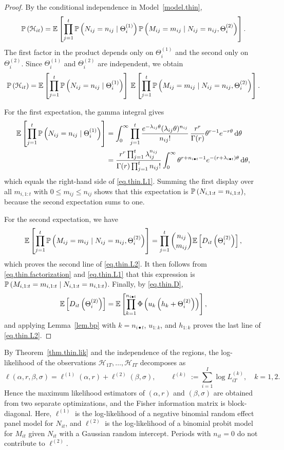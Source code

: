 \begin{proof}
By the conditional independence in Model~\ref{model.thin},
\[
\P{\mathcal H_{it}}
=
\E{
\prod_{j=1}^t
\P{N_{ij}=n_{ij}\mid\Theta_i^{(1)}}
\P{M_{ij}=m_{ij}\mid N_{ij}=n_{ij},\Theta_i^{(2)}}
}.
\]
The first factor in the product depends only on \(\Theta_i^{(1)}\) and
the second only on \(\Theta_i^{(2)}\). Since \(\Theta_i^{(1)}\) and
\(\Theta_i^{(2)}\) are independent, we obtain
\[
\P{\mathcal H_{it}}
=
\E{
\prod_{j=1}^t
\P{N_{ij}=n_{ij}\mid\Theta_i^{(1)}}
}
\,
\E{
\prod_{j=1}^t
\P{M_{ij}=m_{ij}\mid N_{ij}=n_{ij},\Theta_i^{(2)}}
}.
\]

For the first expectation, the gamma integral gives
\[
\begin{aligned}
\E{
\prod_{j=1}^t
\P{N_{ij}=n_{ij}\mid\Theta_i^{(1)}}
}
&=
\int_0^\infty
\prod_{j=1}^t
\frac{e^{-\lambda_{ij}\theta}(\lambda_{ij}\theta)^{n_{ij}}}{n_{ij}!}
\,
\frac{r^r}{\Gamma(r)}\theta^{r-1}e^{-r\theta}
\,{\rm d}\theta\\
&=
\frac{r^r\prod_{j=1}^t\lambda_{ij}^{n_{ij}}}
{\Gamma(r)\prod_{j=1}^t n_{ij}!}
\int_0^\infty
\theta^{r+n_{i\bullet t}-1}
e^{-(r+\lambda_{i\bullet t})\theta}
\,{\rm d}\theta,
\end{aligned}
\]
which equals the right-hand side of \eqref{eq.thin.L1}. Summing the
first display over all \(m_{i,1:t}\) with \(0\le m_{ij}\le n_{ij}\)
shows that this expectation is \(\P{N_{i,1:t}=n_{i,1:t}}\), because
the second expectation sums to one.

For the second expectation, we have
\[
\E{
\prod_{j=1}^t
\P{M_{ij}=m_{ij}\mid N_{ij}=n_{ij},\Theta_i^{(2)}}
}
=
\prod_{j=1}^t\binom{n_{ij}}{m_{ij}}
\E{D_{it}\left(\Theta_i^{(2)}\right)},
\]
which proves the second line of \eqref{eq.thin.L2}. It then follows
from \eqref{eq.thin.factorization} and \eqref{eq.thin.L1} that this
expression is \(\P{M_{i,1:t}=m_{i,1:t}\mid N_{i,1:t}=n_{i,1:t}}\).
Finally, by \eqref{eq.thin.D},
\[
\E{D_{it}\left(\Theta_i^{(2)}\right)}
=
\E{
\prod_{k=1}^{n_{i\bullet t}}
\Phi\left(u_k\left(h_k+\Theta_i^{(2)}\right)\right)
},
\]
and applying Lemma~\ref{lem.bp} with \(k=n_{i\bullet t}\),
\(u_{1:k}\), and \(h_{1:k}\) proves the last line of
\eqref{eq.thin.L2}.
\end{proof}

\begin{remark}
\label{rem.thin.estimation}
By Theorem~\ref{thm.thin.lik} and the independence of the regions,
the log-likelihood of the observations
\(\mathcal H_{1T},\ldots,\mathcal H_{IT}\) decomposes as
\[
\ell(\alpha,r,\beta,\sigma)
=
\ell^{(1)}(\alpha,r)+\ell^{(2)}(\beta,\sigma),
\qquad
\ell^{(k)}:=\sum_{i=1}^I\log L^{(k)}_{iT},
\quad k=1,2.
\]
Hence the maximum likelihood estimators of \((\alpha,r)\) and
\((\beta,\sigma)\) are obtained from two separate optimizations, and
the Fisher information matrix is block-diagonal. Here,
\(\ell^{(1)}\) is the log-likelihood of a negative binomial
random effect panel model for \(N_{it}\), and \(\ell^{(2)}\) is the
log-likelihood of a binomial probit model for \(M_{it}\) given
\(N_{it}\) with a Gaussian random intercept. Periods with \(n_{it}=0\)
do not contribute to \(\ell^{(2)}\).
\end{remark}

